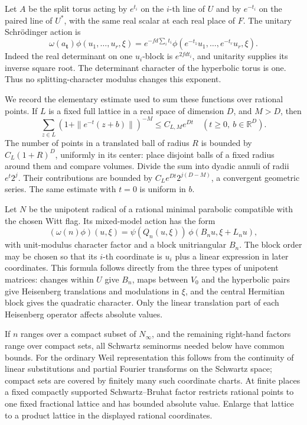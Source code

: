 Let \(A\) be the split torus acting by \(e^{t_i}\) on
the \(i\)-th line of \(U\) and by \(e^{-t_i}\) on the
paired line of \(U^*\), with the same real scalar at
each real place of \(F\).
The unitary Schr\"odinger action is
\begin{equation}\label{eq:sr-large-cartan-action}
 \omega(a_{\mathbf t})\phi(u_1,\ldots,u_r,\xi)
   =e^{-fd\sum_i t_i}
       \phi(e^{-t_1}u_1,\ldots,e^{-t_r}u_r,\xi).
\end{equation}
Indeed the real determinant on one \(u_i\)-block is
\(e^{2fd t_i}\), and unitarity supplies its inverse
square root.
The determinant character of the hyperbolic torus is
one.  Thus no splitting-character modulus changes
this exponent.

We record the elementary estimate used to sum these
functions over rational points.
If \(L\) is a fixed full lattice in a real space of
dimension \(D\), and \(M>D\), then
\begin{equation}\label{eq:sr-large-shifted-lattice}
       \sum_{z\in L}(1+\|e^{-t}(z+b)\|)^{-M}
                  \le C_{L,M}e^{Dt}
          \quad(t\ge0,\ b\in\mathbb R^D).
\end{equation}
The number of points in a translated ball of radius
\(R\) is bounded by \(C_L(1+R)^D\), uniformly in its
center: place disjoint balls of a fixed radius around
them and compare volumes.
Divide the sum into dyadic annuli of radii
\(e^t2^j\).  Their contributions are bounded by
\(C_Le^{Dt}2^{j(D-M)}\), a convergent geometric series.
The same estimate with \(t=0\) is uniform in \(b\).

Let \(N\) be the unipotent radical of a rational minimal
parabolic compatible with the chosen Witt flag.
Its mixed-model action has the form
\[
 (\omega(n)\phi)(u,\xi)
     =\psi(Q_n(u,\xi))\,
                   \phi(B_nu,\xi+L_nu),
\]
with unit-modulus character factor and a block unitriangular
\(B_n\).
The block order may be chosen so that its \(i\)-th coordinate
is \(u_i\) plus a linear expression in later coordinates.
This formula follows directly from the three types of
unipotent matrices: changes within \(U\) give \(B_n\),
maps between \(V_0\) and the hyperbolic pairs give
Heisenberg translations and modulations in \(\xi\),
and the central Hermitian block gives the quadratic
character.
Only the linear translation part of each Heisenberg
operator affects absolute values.

If \(n\) ranges over a compact subset of \(N_\infty\),
and the remaining right-hand factors range over compact
sets, all Schwartz seminorms needed below have common
bounds.
For the ordinary Weil representation this follows from
the continuity of linear substitutions and partial
Fourier transforms on the Schwartz space; compact sets
are covered by finitely many such coordinate charts.
At finite places a fixed compactly supported
Schwartz--Bruhat factor restricts rational points to
one fixed fractional lattice and has bounded absolute
value.
Enlarge that lattice to a product lattice in the
displayed rational coordinates.

